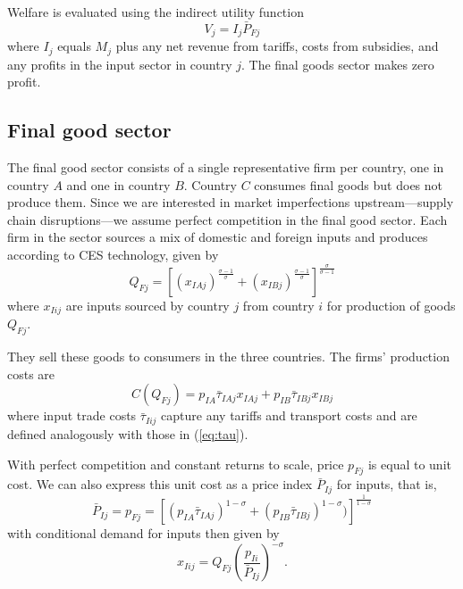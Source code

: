 \documentclass{article}
\begin{document}
Welfare is evaluated using the indirect utility function
\begin{equation} \label{eq:value}
    V_j = I_j \bar{P}_{Fj}
\end{equation}
where $I_j$ equals $M_j$ plus any net revenue from tariffs, costs from subsidies, and any profits in the input sector in country $j$. The final goods sector makes zero profit.

\subsection{Final good sector}

The final good sector consists of a single representative firm per country, one in country $A$ and one in country $B$. Country $C$ consumes final goods but does not produce them. Since we are interested in market imperfections upstream---supply chain disruptions---we assume perfect competition in the final good sector. Each firm in the sector sources a mix of domestic and foreign inputs and produces according to CES technology, given by
\begin{equation} \label{eq:prod_final}
    Q_{Fj} = \left[ \left( x_{IAj} \right)^\frac{\sigma-1}{\sigma} + \left( x_{IBj} \right)^\frac{\sigma-1}{\sigma} \right]^\frac{\sigma}{\sigma-1}
\end{equation}
where $x_{Iij}$ are inputs sourced by country $j$ from country $i$ for production of goods $Q_{Fj}$. 

They sell these goods to consumers in the three countries. The firms' production costs are
\begin{equation}
    C(Q_{Fj}) = p_{IA} \bar{\tau}_{IAj} x_{IAj} + p_{IB} \bar{\tau}_{IBj} x_{IBj}
\end{equation}
where input trade costs $\bar{\tau}_{Iij}$ capture any tariffs and transport costs and are defined analogously with those in (\ref{eq:tau}).

With perfect competition and constant returns to scale, price $p_{Fj}$ is equal to unit cost. We can also express this unit cost as a price index $\bar{P}_{Ij}$ for inputs, that is,
\begin{equation}
    \bar{P}_{Ij} = p_{Fj} = \left[ ( p_{IA} \bar{\tau}_{IAj} )^{1 - \sigma} + ( p_{IB} \bar{\tau}_{IBj} )^{1 - \sigma}) \right]^{\frac{1}{1 - \sigma}}
\end{equation}
with conditional demand for inputs then given by
\begin{equation} \label{eq:input_demand}
    x_{Iij} = Q_{Fj} \left( \frac{p_{Ii}}{\bar{P}_{Ij}} \right)^{-\sigma}.
\end{equation}
\end{document}
